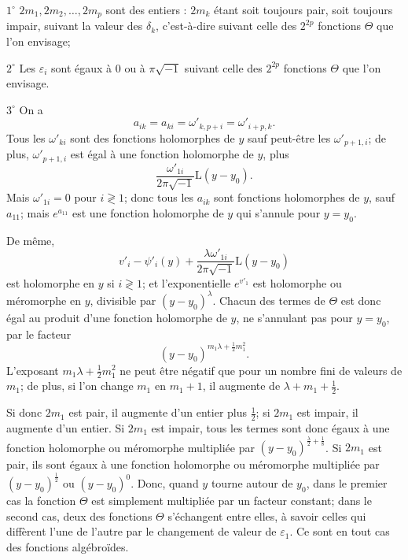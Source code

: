 \documentclass{article}
\begin{document}
$1^{\circ}$ $2m_{1}, 2m_{2}, \ldots, 2m_{p}$ sont des entiers : $2m_{k}$ étant soit toujours pair, soit toujours impair, suivant la valeur des $\delta_{k}$, c'est-à-dire suivant celle des $2^{2p}$ fonctions $\Theta$ que l'on envisage;

$2^{\circ}$ Les $\varepsilon_{i}$ sont égaux à $0$ ou à $\pi\sqrt{-1}$ suivant celle des $2^{2p}$ fonctions $\Theta$ que l'on envisage.

$3^{\circ}$ On a
\[
a_{ik} = a_{ki} = \omega'_{k, p+i} = \omega'_{i+p, k}.
\]
Tous les $\omega'_{ki}$ sont des fonctions holomorphes de $y$ sauf peut-être les $\omega'_{p+1, i}$; de plus, $\omega'_{p+1, i}$ est égal à une fonction holomorphe de $y$, plus
\[
\frac{\omega'_{1i}}{2\pi\sqrt{-1}}\mathrm{L}(y - y_{0}).
\]
Mais $\omega'_{1i} = 0$ pour $i \gtrless 1$; donc tous les $a_{ik}$ sont fonctions holomorphes de $y$, sauf $a_{11}$; mais $e^{a_{11}}$ est une fonction holomorphe de $y$ qui s'annule pour $y = y_{0}$.

De même,
\[
v'_{i} - \psi'_{i}(y) + \frac{\lambda \omega'_{1i}}{2\pi\sqrt{-1}}\mathrm{L}(y - y_{0})
\]
est holomorphe en $y$ si $i \gtrless 1$; et l'exponentielle $e^{v'_{1}}$ est holomorphe ou méromorphe en $y$, divisible par $(y - y_{0})^{\lambda}$. Chacun des termes de $\Theta$ est donc égal au produit d'une fonction holomorphe de $y$, ne s'annulant pas pour $y = y_{0}$, par le facteur
\[
(y - y_{0})^{m_{1}\lambda + \frac{1}{2}m_{1}^{2}}.
\]
L'exposant $m_{1}\lambda + \frac{1}{2}m_{1}^{2}$ ne peut être négatif que pour un nombre fini de valeurs de $m_{1}$; de plus, si l'on change $m_{1}$ en $m_{1} + 1$, il augmente de $\lambda + m_{1} + \frac{1}{2}$.

Si donc $2m_{1}$ est pair, il augmente d'un entier plus $\frac{1}{2}$; si $2m_{1}$ est impair, il augmente d'un entier. Si $2m_{1}$ est impair, tous les termes sont donc égaux à une fonction holomorphe ou méromorphe multipliée par $(y - y_{0})^{\frac{\lambda}{2} + \frac{1}{8}}$. Si $2m_{1}$ est pair, ils sont égaux à une fonction holomorphe ou méromorphe multipliée par $(y - y_{0})^{\frac{1}{2}}$ ou $(y - y_{0})^{0}$. Donc, quand $y$ tourne autour de $y_{0}$, dans le premier cas la fonction $\Theta$ est simplement multipliée par un facteur constant; dans le second cas, deux des fonctions $\Theta$ s'échangent entre elles, à savoir celles qui diffèrent l'une de l'autre par le changement de valeur de $\varepsilon_{1}$. Ce sont en tout cas des fonctions algébroïdes.
\end{document}
